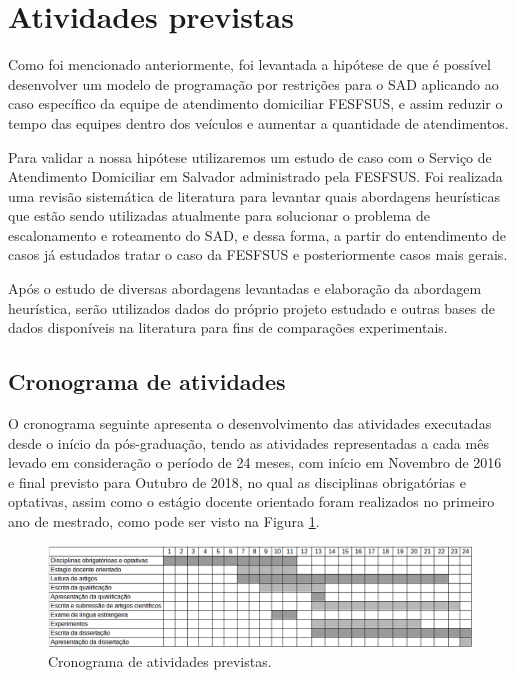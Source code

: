 
\section{Atividades previstas}
Como foi mencionado anteriormente, foi levantada a hipótese de que é possível desenvolver um modelo de programação por restrições para o \ac{SAD} aplicando ao caso específico da equipe de atendimento domiciliar FESFSUS, e assim reduzir o tempo das equipes dentro dos veículos e aumentar a quantidade de atendimentos.

Para validar a nossa hipótese utilizaremos um estudo de caso com o Serviço de Atendimento Domiciliar em Salvador administrado pela \ac{FESFSUS}. Foi realizada uma revisão sistemática de literatura para levantar quais abordagens heurísticas que estão sendo utilizadas atualmente para solucionar o problema de escalonamento e roteamento do \ac{SAD}, e dessa forma, a partir do entendimento de casos já estudados tratar o caso da \ac{FESFSUS} e posteriormente casos mais gerais.

Após o estudo de diversas abordagens levantadas e elaboração da abordagem heurística, serão utilizados dados do próprio projeto estudado e outras bases de dados disponíveis na literatura para fins de comparações experimentais.

\subsection{Cronograma de atividades}

O cronograma seguinte apresenta o desenvolvimento das atividades executadas desde o início da pós-graduação, tendo as atividades representadas a cada mês levado em consideração o período de 24 meses, com início em Novembro de 2016 e final previsto para Outubro de 2018, no qual as disciplinas obrigatórias e optativas, assim como o estágio docente orientado foram realizados no primeiro ano de mestrado, como pode ser visto na Figura \ref{cronograma_atividade}.

\begin{figure}[H]
\includegraphics[width=1 \textwidth]{cronograma_atividades.png}
\begin{center}
\caption{Cronograma de atividades previstas. \label{cronograma_atividade}}
\end{center}
\end{figure}

